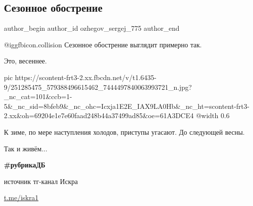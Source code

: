  
 
 
 
 
 
\subsection{Сезонное обострение}
\label{sec:01_11_2021.fb.ozhegov_sergej_775.1.sezonnoje_obostrenie}
 
\ifcmt
 author_begin
   author_id ozhegov_sergej_775
 author_end
\fi

@igg{fbicon.collision}  Сезонное обострение выглядит примерно так.

Это, весеннее. 

\ifcmt
  pic https://scontent-frt3-2.xx.fbcdn.net/v/t1.6435-9/251285475_579388496615462_7444497840063993721_n.jpg?_nc_cat=101&ccb=1-5&_nc_sid=8bfeb9&_nc_ohc=Icxja1E2E_IAX9LA0Hb&_nc_ht=scontent-frt3-2.xx&oh=69204e1e7e60faad248b44a37499ad85&oe=61A3DCE4
  @width 0.6
\fi

К зиме, по мере наступления холодов, приступы угасают. До следующей весны.

Так и живём...

\textbf{\#рубрикаДБ}

источник тг-канал Искра 

\url{t.me/iskra1}

